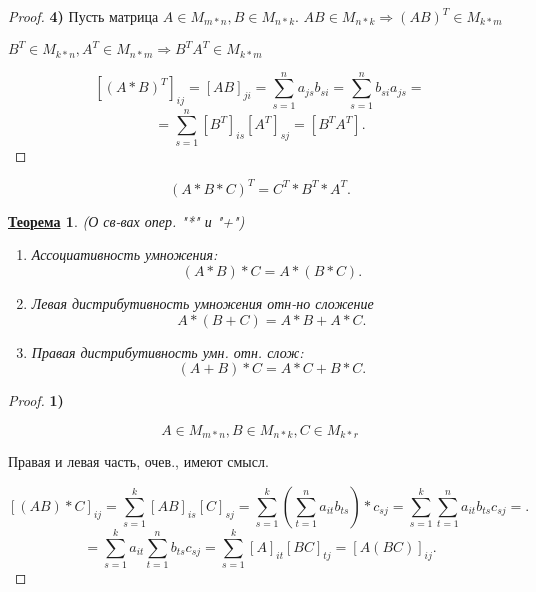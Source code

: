\documentclass[12pt]{article}
\newtheorem{theorem}{\underline{Теорема}}[section]
\theoremstyle{definition}
\theoremstyle{definition}
\begin{document}
\begin{proof}
\textbf{4)} Пусть матрица $A \in M_{m * n}, B \in M_{n * k}$. $AB \in M_{n * k} \Rightarrow (AB)^{T}\in M_{k * m}$ 

$B^{T} \in M_{k * n}, A^{T} \in M_{n * m} \Rightarrow B^{T}A^{T} \in M_{k * m}$ 

\[
    [(A * B)^{T}]_{ij} = [AB]_{ji} = \sum_{s = 1}^{n}a_{js}b_{si} = \sum_{s = 1}^{n}b_{si}a_{js} =
\] 
\[
    = \sum_{s = 1}^{n}[B^{T}]_{is}[A^{T}]_{sj} = [B^{T}A^{T}]
.\] 
\end{proof}

\[
    (A * B * C)^{T} = C^{T} * B^{T} * A^{T}
.\] 

\begin{theorem} (О св-вах опер. "*" и "+")
\begin{enumerate}
    \item Ассоциативность умножения:
        \[
            (A * B) * C = A * (B * C)
        .\] 
    \item Левая дистрибутивность умножения отн-но сложение
        \[
        A * (B + C) = A * B + A * C
        .\] 
    \item Правая дистрибутивность умн. отн. слож:
        \[
            (A + B) * C = A * C + B * C
        .\] 
\end{enumerate}

\end{theorem}

\begin{proof}
    \textbf{1)}
    
    \[
        A \in M_{m * n}, B \in M_{n * k}, C \in M_{k * r}
    \]

Правая и левая часть, очев., имеют смысл.

\[
[(AB) * C]_{ij} = \sum_{s = 1}^{k} [AB]_{is}[C]_{sj} = \sum_{s = 1}^{k} (\sum_{t = 1}^{n} a_{it}b_{ts}) * c_{sj} = \sum_{s = 1}^{k} \sum_{t = 1}^{n}  a_{it} b_{ts}c_{sj} = 
.\] 
\[
= \sum_{s = 1}^{k} a_{it} \sum_{t = 1}^{n} b_{ts}c_{sj} = \sum_{s = 1}^{k} [A]_{it}[BC]_{tj} = [A(BC)]_{ij}
.\] 
\end{proof}
\end{document}
